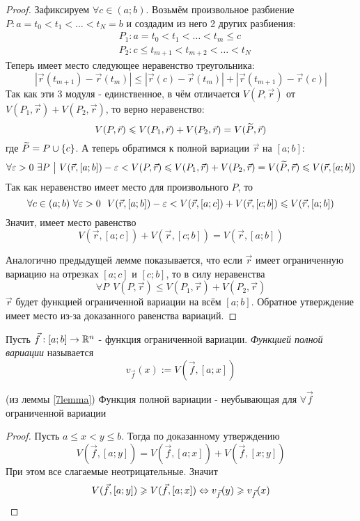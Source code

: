 \begin{proof}
	Зафиксируем $\forall c \in (a; b)$. Возьмём произвольное разбиение $P: a = t_0 < t_1 < \ldots < t_N = b$ и создадим из него 2 других разбиения:
	\begin{align*}
		&{P_1: a = t_0 < t_1 < \ldots < t_m \le c}
		\\
		&{P_2: c \le t_{m + 1}  < t_{m + 2} < \ldots < t_N}
	\end{align*}
	Теперь имеет место следующее неравенство треугольника:
	\[
		|\vec{r}(t_{m + 1}) - \vec{r}(t_m)| \le |\vec{r}(c) - \vec{r}(t_m)| + |\vec{r}(t_{m + 1}) - \vec{r}(c)|
	\]
	Так как эти 3 модуля - единственное, в чём отличается $V(P, \vec{r})$ от $V(P_1, \vec{r}) + V(P_2, \vec{r})$, то верно неравенство:
	\[
		V(P, \vec{r}) \leqslant V(P_1, \vec{r}) + V(P_2, \vec{r}) = V(\widetilde{P}, \vec{r})
	\]
	где $\widetilde{P} = P \cup \{c\}$. А теперь обратимся к полной вариации $\vec{r}$ на $[a; b]$:
	\[
		\forall \varepsilon > 0\ \exists P \ \big|\  V(\vec{r}, [a; b]) - \varepsilon < V(P, \vec{r}) \leqslant V(P_1, \vec{r}) + V(P_2, \vec{r}) = V(\widetilde{P}, \vec{r}) \leqslant V(\vec{r}, [a; b])
	\]
	Так как неравенство имеет место для произвольного $P$, то
	\[
		\forall c \in (a; b)\ \forall \varepsilon > 0\ \ V(\vec{r}, [a; b]) - \varepsilon < V(\vec{r}, [a; c]) + V(\vec{r}, [c; b]) \leqslant V(\vec{r}, [a; b])
	\]
	Значит, имеет место равенство
	\[
		V(\vec{r}, [a; c]) + V(\vec{r}, [c; b]) = V(\vec{r}, [a; b])
	\]
	
	Аналогично предыдущей лемме показывается, что если $\vec{r}$ имеет ограниченную вариацию на отрезках $[a; c]$ и $[c; b]$, то в силу неравенства
	\[
		\forall P\ \ V(P, \vec{r}) \le V(P_1, \vec{r}) + V(P_2, \vec{r})
	\]
	$\vec{r}$ будет функцией ограниченной вариации на всём $[a; b]$. Обратное утверждение имеет место из-за доказанного равенства вариаций.
\end{proof}

\begin{definition}
	Пусть $\vec{f}: [a; b] \to \mathbb{R}^n$ - функция ограниченной вариации. \textit{Функцией полной вариации} называется
	\[
		v_{\vec{f}}(x) := V(\vec{f}, [a; x])
	\]
\end{definition}

\begin{corollary} (из леммы \ref{7lemma})
	Функция полной вариации - неубывающая для $\forall \vec{f}$ ограниченной вариации
\end{corollary}

\begin{proof}
	Пусть $a \le x < y \le b$. Тогда по доказанному утверждению
	\[
		V(\vec{f}, [a; y]) = V(\vec{f}, [a; x]) + V(\vec{f}, [x; y])
	\]
	При этом все слагаемые неотрицательные. Значит
	\[
		V(\vec{f}, [a; y]) \geqslant V(\vec{f}, [a; x]) \Leftrightarrow v_{\vec{f}}(y) \geqslant v_{\vec{f}}(x)
	\]
\end{proof}

